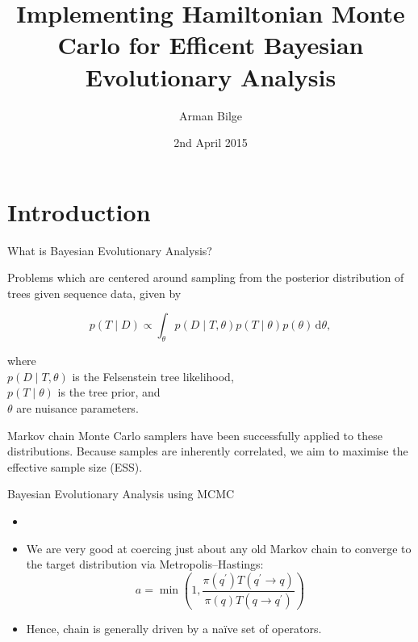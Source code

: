 \documentclass{beamer}
\title[HMC]{Implementing Hamiltonian Monte Carlo for Efficent Bayesian Evolutionary Analysis}
\author{Arman Bilge}
\date{2nd April 2015}
\newcommand{\dd}{\, \text{d}}
\begin{document}
    \frame{\titlepage}

    \section{Introduction}

    \begin{frame}{What is Bayesian Evolutionary Analysis?}

        Problems which are centered around sampling from the posterior distribution of trees given sequence data, given by

        \begin{equation*}
            p\left(T \mid D\right)
                \propto \int_\theta p\left(D \mid T,\theta\right)
                p\left(T \mid \theta\right) p\left(\theta\right) \dd\theta,
        \end{equation*}

        where \\
        $p\left(D \mid T,\theta\right)$ is the Felsenstein tree likelihood, \\
        $p\left(T \mid \theta\right)$ is the tree prior, and \\
        $\theta$ are nuisance parameters.

        \vspace{14pt}
        Markov chain Monte Carlo samplers have been successfully applied to these distributions.
        Because samples are inherently correlated, we aim to maximise the effective sample size (ESS).

    \end{frame}

    \begin{frame}{Bayesian Evolutionary Analysis using MCMC}

        \begin{itemize}
            \item {} 
            \item<2-> We are very good at coercing just about any old Markov chain to converge to the target distribution via Metropolis--Hastings:
            \begin{equation*}
                a = \min\left(1, \frac{\pi\left(q^\prime\right)T\left(q^\prime\to q\right)}{\pi\left(q\right)T\left(q\to q^\prime\right)}\right)
            \end{equation*}
            \pause
            \item Hence, chain is generally driven by a na\"ive set of operators.
        \end{itemize}

    \end{frame}
\end{document}
